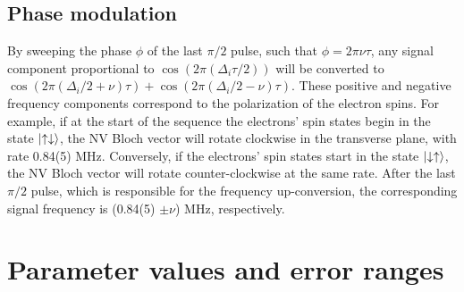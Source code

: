 \documentclass[%
 reprint,
 amsmath,amssymb,
 aps,
]{revtex4-1}
\begin{document}
\subsection{Phase modulation}
By sweeping the phase $\phi$ of the last $\pi/2$ pulse, such that $\phi = 2\pi\nu\tau$, any signal component proportional to $\cos{(2\pi(\Delta_{i}\tau/2))}$ will be converted to $\cos{(2\pi(\Delta_{i}/2+\nu)\tau)}+\cos{(2\pi(\Delta_{i}/2-\nu)\tau)}$. These positive and negative frequency components correspond to the polarization of the electron spins. For example, if at the start of the sequence the electrons' spin states begin in the state $\ket{\uparrow\downarrow}$, the NV Bloch vector will rotate clockwise in the transverse plane, with rate 0.84(5) MHz. Conversely, if the electrons' spin states start in the state $\ket{\downarrow\uparrow}$, the NV Bloch vector will rotate counter-clockwise at the same rate. After the last $\pi/2$ pulse, which is responsible for the frequency up-conversion, the corresponding signal frequency is (0.84(5) $ \pm \nu$) MHz, respectively.

\section{Parameter values and error ranges}
\end{document}
